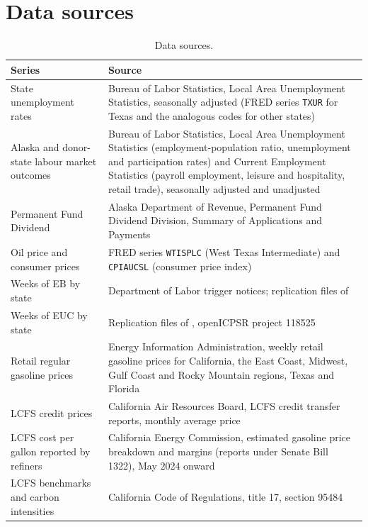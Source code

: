 \documentclass[12pt,a4paper]{article}
\theoremstyle{definition}
\theoremstyle{definition}\newtheorem{example}{Example}
\theoremstyle{definition}\newtheorem{definition}{Definition}
\begin{document}
\section{Data sources\label{sec:data}}

\begin{table}[H]
\centering\small
\caption{Data sources.\label{tab:data}}
\begin{tabular}{p{5cm}p{9cm}}
\toprule
Series & Source\\
\midrule
State unemployment rates & Bureau of Labor Statistics, Local Area Unemployment Statistics, seasonally adjusted (FRED series \texttt{TXUR} for Texas and the analogous codes for other states)\\
Alaska and donor-state labour market outcomes & Bureau of Labor Statistics, Local Area Unemployment Statistics (employment-population ratio, unemployment and participation rates) and Current Employment Statistics (payroll employment, leisure and hospitality, retail trade), seasonally adjusted and unadjusted\\
Permanent Fund Dividend & Alaska Department of Revenue, Permanent Fund Dividend Division, Summary of Applications and Payments\\
Oil price and consumer prices & FRED series \texttt{WTISPLC} (West Texas Intermediate) and \texttt{CPIAUCSL} (consumer price index)\\
Weeks of EB by state & Department of Labor trigger notices; replication files of \citet{BooneEtAl2021}\\
Weeks of EUC by state & Replication files of \citet{BooneEtAl2021}, openICPSR project 118525\\
Retail regular gasoline prices & Energy Information Administration, weekly retail gasoline prices for California, the East Coast, Midwest, Gulf Coast and Rocky Mountain regions, Texas and Florida\\
LCFS credit prices & California Air Resources Board, LCFS credit transfer reports, monthly average price\\
LCFS cost per gallon reported by refiners & California Energy Commission, estimated gasoline price breakdown and margins (reports under Senate Bill 1322), May 2024 onward\\
LCFS benchmarks and carbon intensities & California Code of Regulations, title 17, section 95484\\
\bottomrule
\end{tabular}
\end{table}



\end{document}
